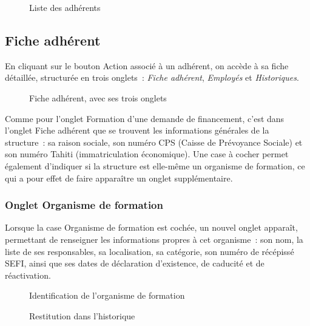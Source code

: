 \begin{figure}[H]
  \centering
  \caption{Liste des adhérents}
  \label{fig:liste-adherents}
\end{figure}

\subsection{Fiche adhérent}

En cliquant sur le bouton \og{}Action\fg{} associé à un adhérent, on
accède à sa fiche détaillée, structurée en trois onglets~: \textit{Fiche
adhérent}, \textit{Employés} et \textit{Historiques}.

\begin{figure}[H]
  \centering
  \caption{Fiche adhérent, avec ses trois onglets}
  \label{fig:fiche-adherent}
\end{figure}

Comme pour l'onglet Formation d'une demande de financement, c'est dans
l'onglet Fiche adhérent que se trouvent les informations générales de la
structure~: sa raison sociale, son numéro CPS (Caisse de Prévoyance
Sociale) et son numéro Tahiti (immatriculation économique). Une case à
cocher permet également d'indiquer si la structure est elle-même un
organisme de formation, ce qui a pour effet de faire apparaître un onglet
supplémentaire.

\subsubsection{Onglet Organisme de formation}

Lorsque la case \og{}Organisme de formation\fg{} est cochée, un nouvel
onglet apparaît, permettant de renseigner les informations propres à cet
organisme~: son nom, la liste de ses responsables, sa localisation, sa
catégorie, son numéro de récépissé SEFI, ainsi que ses dates de
déclaration d'existence, de caducité et de réactivation.

\begin{figure}[H]
  \centering
  \caption{Identification de l'organisme de formation}
  \label{fig:identification-of}
\end{figure}

\begin{figure}[H]
  \centering
  \caption{Restitution dans l'historique}
  \label{fig:identification-of-hist}
\end{figure}

